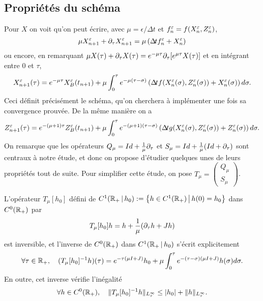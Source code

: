 \subsection{Propriétés du schéma}

Pour $X$ on voit qu'on peut écrire, avec $\mu = \epsilon/\Delta t$ et $f_n^{\varepsilon} = f(X_n^{\varepsilon},Z_n^{\varepsilon})$, 
$$ \mu X_{n+1}^{\varepsilon} + \partial_{\tau} X_{n+1}^{\varepsilon} = \mu\left(\Delta\!\!\!\ t f_n^{\varepsilon} + X_n^{\varepsilon} \right) $$
ou encore, en remarquant $\mu X(\tau) + \partial_{\tau} X(\tau) = e^{-\mu\tau}\partial_{\tau}[e^{\mu\tau}X(\tau)]$ et en intégrant entre $0$ et $\tau$, 
\begin{equation} \label{eq:inv_Qmu_X}
X_{n+1}^{\varepsilon}(\tau) = e^{-\mu\tau}X_B^{\varepsilon}(t_{n+1}) + \mu\int_0^{\tau} e^{-\mu(\tau-\sigma)}\left(\Delta\!\!\!\ t f(X_n^{\varepsilon}(\sigma),Z_n^{\varepsilon}(\sigma)) + X_n^{\varepsilon}(\sigma)\right)d\sigma. 
\end{equation}
Ceci définit précisément le schéma, qu'on cherchera à implémenter une fois sa convergence prouvée. De la même manière on a 
\begin{equation} \label{eq:inv_Smu_Z}
Z_{n+1}^{\varepsilon}(\tau) = e^{-(\mu+1)\tau}Z_B^{\varepsilon}(t_{n+1}) + \mu\int_0^{\tau} e^{-(\mu+1)(\tau-\sigma)}\left( \Delta\!\!\!\ t g(X_n^{\varepsilon}(\sigma),Z_n^{\varepsilon}(\sigma)) + Z_n^{\varepsilon}(\sigma)\right)d\sigma. 
\end{equation}
On remarque que les opérateurs $Q_{\mu} = Id + \frac{1}{\mu}\partial_{\tau}$ et $S_{\mu} = Id + \frac{1}{\mu}(Id + \partial_{\tau})$ sont centraux à notre étude, et donc on propose d'étudier quelques unes de leurs propriétés tout de suite. 
Pour simplifier cette étude, on pose $T_{\mu} = \begin{pmatrix}
Q_{\mu} \\ S_{\mu} 
\end{pmatrix}$.

\begin{lemma} \label{thm:op_Tmu}
L'opérateur $T_{\mu}[h_0]$ défini de $C^1(\mathbb{R}_+ \,|\, h_0) := \left\{ h\in C^1(\mathbb{R}_+) \,\big|\, h(0) = h_0 \right\}$ dans $C^0(\mathbb{R}_+)$ par 
$$ T_{\mu}[h_0]h = h + \frac{1}{\mu}(\partial_{\tau} h + J h) $$
est inversible, et l'inverse de $C^0(\mathbb{R}_+)$ dans $C^1(\mathbb{R}_+\,|\, h_0)$ s'écrit explicitement 
$$\forall \tau\in\mathbb{R}_+, \quad (T_{\mu}[h_0]^{-1}h)(\tau) = e^{-\tau(\mu I+J)}h_0 + \mu \int_0^{\tau}e^{-(\tau-\sigma)(\mu I + J)}h(\sigma)d\sigma. $$
En outre, cet inverse vérifie l'inégalité 
$$\forall h\in C^0(\mathbb{R}_+), \quad \|T_{\mu}[h_0]^{-1}h\|_{L^{\infty}_{\tau}} \leq |h_0| + \|h\|_{L^{\infty}_{\tau}}. $$

\end{lemma}

